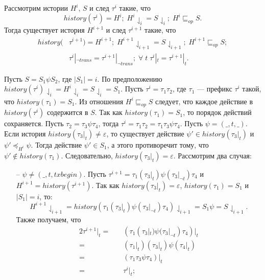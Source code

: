 \begin{lemma}\label{sufficiency2}
Рассмотрим истории $H^i$, $S$ и след $\tau^i$ такие, что $$history(\tau^i) = H^i; \; H^i\downharpoonleft_i = S \downharpoonleft_i; \; H^i \sqsubseteq_{op} S.$$ Тогда существует история $H^{i+1}$ и след $\tau^{i+1}$ такие, что 
\begin{align*}
history(&\tau^{i+1}) = H^{i+1}; \; H^{i+1}\downharpoonleft_{i+1} = S \downharpoonleft_{i+1}; \; H^{i+1} \sqsubseteq_{op} S; \\
&\tau^{i}|_{\neg trans} = \tau^{i+1}|_{\neg trans}; \; \forall \; t \; \tau^{i}|_t = \tau^{i+1}|_t.
\end{align*} \end{lemma}
\begin{myproof}
Пусть $S=S_1\psi{S_2}$, где $|S_1| = i$. По предположению $history(\tau^i)\downharpoonleft_i = H^i\downharpoonleft_i = S\downharpoonleft_i=S_1$. Пусть $\tau^i=\tau_1\tau_2$, где $\tau_1$ --- префикс $\tau^i$ такой, что $history(\tau_1) = S_1$. Из отношения $H^{i} \sqsubseteq_{op} S$ следует, что каждое действие в $history(\tau^i)$ содержится в $S$. Так как $history(\tau_1) = S_1$, то порядок действий сохраняется. Пусть $\tau_2 = \tau_3\psi\tau_4$, тогда $\tau^i = \tau_1\tau_2 = \tau_1\tau_3\psi\tau_4$. Пусть $\psi = (\_, t, \_)$. Если история $history(\tau_3|_t) \neq \varepsilon$, то существует действие $\psi' \in history(\tau_3|_t)$ и $\psi' \preceq_{H^i} \psi$. Тогда действие $\psi' \in S_1$, а этого противоречит тому, что $\psi' \notin history(\tau_1)$. Следовательно, $history(\tau_3|_t) = \varepsilon$. Рассмотрим два случая:
\begin{enumerate}[listparindent=1.5em]
\item[--] $\psi \neq (\_, t, txbegin)$. Пусть $\tau^{i+1} = \tau_1(\tau_3|_t)\psi(\tau_3|_{\neg t})\tau_4$ и $H^{i+1} = history(\tau^{i+1})$. Так как $history(\tau_3|_t) = \varepsilon$, $history(\tau_1) = S_1$ и $|S_1| = i$, то: $$H^{i+1}\downharpoonleft_{i+1} = history(\tau_1(\tau_3|_t)\psi(\tau_3|_{\neg t})\tau_4)\downharpoonleft_{i+1} = S_1\psi = S\downharpoonleft_{i+1}.$$ Также получаем, что 
\begin{alignat}{2}
\tau^{i+1}|_t =& \quad (\tau_1(\tau_3|_t)\psi(\tau_3|_{\neg t})\tau_4)|_t \nonumber \\
              =& \quad (\tau_1|_t)(\tau_3|_t)\psi(\tau_4|_t) \nonumber \\
              =& \quad (\tau_1\tau_3\psi\tau_4)|_t \nonumber \\
              =& \quad \tau^i|_t; \nonumber \\

\end{alignat}
\end{enumerate}
\end{myproof}
